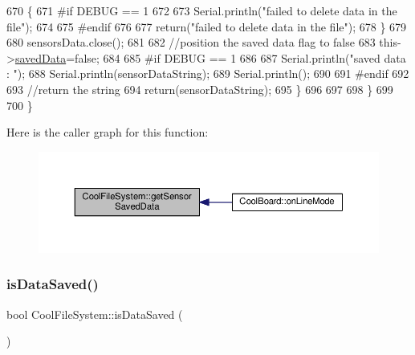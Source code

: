 \begin{DoxyCode}
670             \{
671 \textcolor{preprocessor}{            #if DEBUG == 1}
672         
673                 Serial.println(\textcolor{stringliteral}{"failed to delete data in the file"});
674         
675 \textcolor{preprocessor}{            #endif}
676 
677                 \textcolor{keywordflow}{return}(\textcolor{stringliteral}{"failed to delete data in the file"});
678             \}
679 
680             sensorsData.close();
681             
682             \textcolor{comment}{//position the saved data flag to false}
683             this->\hyperlink{classCoolFileSystem_ad398e0c5c41a0c88acdf5d672aa71351}{savedData}=\textcolor{keyword}{false}; 
684             
685 \textcolor{preprocessor}{        #if DEBUG == 1 }
686 
687             Serial.println(\textcolor{stringliteral}{"saved data : "});
688             Serial.println(sensorDataString);
689             Serial.println();
690         
691 \textcolor{preprocessor}{        #endif}
692 
693             \textcolor{comment}{//return the string}
694             \textcolor{keywordflow}{return}(sensorDataString);       
695         \}
696         
697         
698     \}
699 
700 \}
\end{DoxyCode}
Here is the caller graph for this function\+:\nopagebreak
\begin{figure}[H]
\begin{center}
\leavevmode
\includegraphics[width=350pt]{classCoolFileSystem_a5c58bca3735c0ed3efb268d70ef998ef_icgraph}
\end{center}
\end{figure}
\mbox{\label{classCoolFileSystem_a5a7eaeea7a9fbf8aaef651d862fa3b5b}} 
\subsubsection{\texorpdfstring{is\+Data\+Saved()}{isDataSaved()}}
{\footnotesize\ttfamily bool Cool\+File\+System\+::is\+Data\+Saved (\begin{DoxyParamCaption}{ }\end{DoxyParamCaption})}

